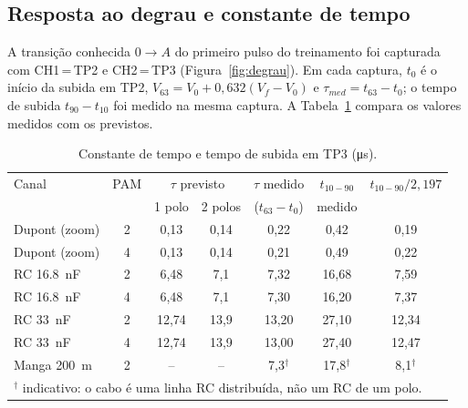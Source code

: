 \documentclass[12pt,a4paper]{article}
\begin{document}
\subsection{Resposta ao degrau e constante de tempo}
\label{sec:tau}

A transição conhecida $0\to A$ do primeiro pulso do treinamento foi capturada com CH1\,=\,TP2 e
CH2\,=\,TP3 (Figura~\ref{fig:degrau}). Em cada captura, $t_0$ é o início da subida em TP2, $V_{63} =
V_0 + 0{,}632(V_f - V_0)$ e $\tau_{med} = t_{63} - t_0$; o tempo de subida $t_{90}-t_{10}$ foi medido
na mesma captura. A Tabela~\ref{tab:tau} compara os valores medidos com os previstos.

\begin{table}[H]
\centering
\caption{Constante de tempo e tempo de subida em TP3 (\si{\micro\second}).}
\label{tab:tau}
\small
\begin{tabular}{l c c c c c c}
\toprule
Canal & PAM & \multicolumn{2}{c}{$\tau$ previsto} & $\tau$ medido & $t_{10-90}$ & $t_{10-90}/2{,}197$ \\
 & & 1 polo & 2 polos & ($t_{63}-t_0$) & medido & \\
\midrule
Dupont (zoom)   & 2 & 0,13 & 0,14 & 0,22 & 0,42 & 0,19 \\
Dupont (zoom)   & 4 & 0,13 & 0,14 & 0,21 & 0,49 & 0,22 \\
RC \SI{16,8}{nF} & 2 & 6,48 & 7,1 & 7,32 & 16,68 & 7,59 \\
RC \SI{16,8}{nF} & 4 & 6,48 & 7,1 & 7,30 & 16,20 & 7,37 \\
RC \SI{33}{nF}   & 2 & 12,74 & 13,9 & 13,20 & 27,10 & 12,34 \\
RC \SI{33}{nF}   & 4 & 12,74 & 13,9 & 13,00 & 27,40 & 12,47 \\
Manga \SI{200}{m} & 2 & -- & -- & 7,3$^\dagger$ & 17,8$^\dagger$ & 8,1$^\dagger$ \\
\bottomrule
\multicolumn{7}{l}{\footnotesize $^\dagger$ indicativo: o cabo é uma linha RC distribuída, não um RC de um polo.}
\end{tabular}
\end{table}
\end{document}

